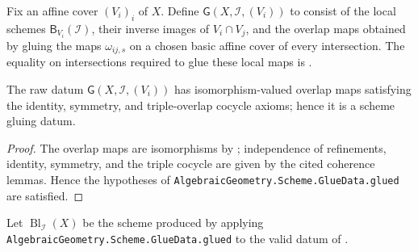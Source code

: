\begin{definition}
  \label{def:nagata-global-blowup-glue-data}

  Fix an affine cover $(V_i)_i$ of $X$.  Define
  $\mathsf G(X,\mathcal I,(V_i))$ to consist of the local schemes
  $\mathsf B_{V_i}(\mathcal I)$, their inverse images of $V_i\cap V_j$, and
  the overlap maps obtained by gluing the maps $\omega_{ij,s}$ on a chosen
  basic affine cover of every intersection.  The equality on intersections
  required to glue these local maps is
  .
\end{definition}

\begin{lemma}
  \label{lemma:nagata-global-blowup-glue-data-valid}

  The raw datum $\mathsf G(X,\mathcal I,(V_i))$ has isomorphism-valued
  overlap maps satisfying the identity, symmetry, and triple-overlap cocycle
  axioms; hence it is a scheme gluing datum.
\end{lemma}

\begin{proof}
  The overlap maps are isomorphisms by
  ; independence of refinements,
  identity, symmetry, and the triple cocycle are given by the cited coherence
  lemmas.  Hence the hypotheses of
  \texttt{AlgebraicGeometry.Scheme.GlueData.glued} are satisfied.
\end{proof}

\begin{definition}
  \label{def:nagata-global-blowup}

  Let $\operatorname{Bl}_{\mathcal I}(X)$ be the scheme produced by applying
  \texttt{AlgebraicGeometry.Scheme.GlueData.glued} to the valid datum of
  .
\end{definition}

